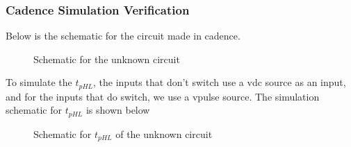 \documentclass[12pt]{article}
\begin{document}
\subsubsection{Cadence Simulation Verification}
Below is the schematic for the circuit made in cadence.
\begin{figure} [H]
    \centering
    \caption{Schematic for the unknown circuit}
\end{figure}
To simulate the $t_{pHL}$, the inputs that don't switch use a vdc source as an input, and for the inputs that do switch, 
we use a vpulse source. 
The simulation schematic for $t_{pHL}$ is shown below
\begin{figure} [H]
    \centering
    \caption{Schematic for $t_{pHL}$ of the unknown circuit}
\end{figure}
\end{document}
